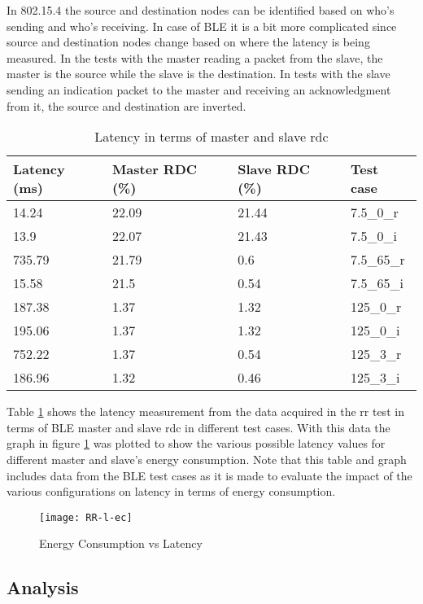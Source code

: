 In 802.15.4 the source and destination nodes can be identified based on who's sending and who's receiving. In case of BLE it is a bit more complicated since source and destination nodes change based on where the latency is being measured. In the tests with the master reading a packet from the slave, the master is the source while the slave is the destination. In tests with the slave sending an indication packet to the master and receiving an acknowledgment from it, the source and destination are inverted.

\begin{table}[h]
\centering
\begin{tabular}[c]{|l|l|l|l|}
\hline
Latency (ms) & Master RDC (\%) & Slave RDC (\%) & Test case \\ \hline
14.24 & 22.09 & 21.44 & 7.5\_0\_r \\ \hline
13.9 & 22.07 & 21.43 & 7.5\_0\_i \\ \hline
735.79 & 21.79 & 0.6 & 7.5\_65\_r \\ \hline
15.58 & 21.5 & 0.54 & 7.5\_65\_i \\ \hline
187.38 & 1.37 & 1.32 & 125\_0\_r \\ \hline
195.06 & 1.37 & 1.32 & 125\_0\_i \\ \hline
752.22 & 1.37 & 0.54 & 125\_3\_r \\ \hline
186.96 & 1.32 & 0.46 & 125\_3\_i \\ \hline
\end{tabular}
\caption{Latency in terms of master and slave \gls{rdc}}
\label{tbl:latVsEnergy}
\end{table}

Table \ref{tbl:latVsEnergy} shows the latency measurement from the data acquired in the \gls{rr} test in terms of BLE master and slave \gls{rdc} in different test cases. With this data the graph in figure \ref{fig:RR-l-ec} was plotted to show the various possible latency values for different master and slave's energy consumption. Note that this table and graph includes data from the BLE test cases as it is made to evaluate the impact of the various configurations on latency in terms of energy consumption.

\begin{figure}[h]
\texttt{[image: RR-l-ec]}
\caption{Energy Consumption vs Latency}
\label{fig:RR-l-ec}
\end{figure}

\subsection{Analysis}
